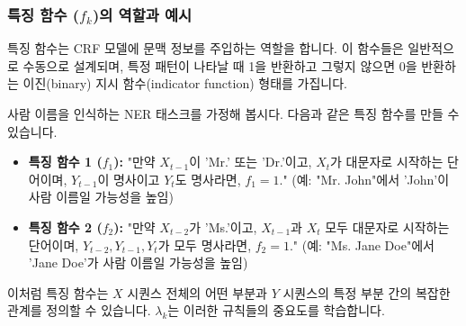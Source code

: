 \documentclass[11pt,a4paper]{article}
\begin{document}
\subsubsection{특징 함수 ($f_k$)의 역할과 예시}
특징 함수는 CRF 모델에 문맥 정보를 주입하는 역할을 합니다. 이 함수들은 일반적으로 수동으로 설계되며, 특정 패턴이 나타날 때 1을 반환하고 그렇지 않으면 0을 반환하는 이진(binary) 지시 함수(indicator function) 형태를 가집니다.

\begin{examplebox}[title=CRF 특징 함수 예시: 사람 이름 인식]
사람 이름을 인식하는 NER 태스크를 가정해 봅시다. 다음과 같은 특징 함수를 만들 수 있습니다.

\begin{itemize}
    \item \textbf{특징 함수 1 ($f_1$):}
    "만약 $X_{t-1}$이 'Mr.' 또는 'Dr.'이고, $X_t$가 대문자로 시작하는 단어이며, $Y_{t-1}$이 명사이고 $Y_t$도 명사라면, $f_1 = 1$."
    (예: "Mr. John"에서 'John'이 사람 이름일 가능성을 높임)

    \item \textbf{특징 함수 2 ($f_2$):}
    "만약 $X_{t-2}$가 'Ms.'이고, $X_{t-1}$과 $X_t$ 모두 대문자로 시작하는 단어이며, $Y_{t-2}, Y_{t-1}, Y_t$가 모두 명사라면, $f_2 = 1$."
    (예: "Ms. Jane Doe"에서 'Jane Doe'가 사람 이름일 가능성을 높임)
\end{itemize}
이처럼 특징 함수는 $X$ 시퀀스 전체의 어떤 부분과 $Y$ 시퀀스의 특정 부분 간의 복잡한 관계를 정의할 수 있습니다. $\lambda_k$는 이러한 규칙들의 중요도를 학습합니다.
\end{examplebox}
\end{document}
